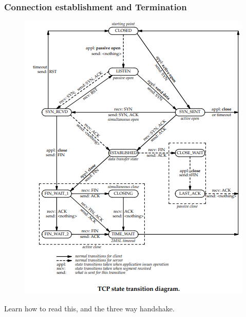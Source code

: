 \documentclass[11pt, a4paper]{article}
\begin{document}
\subsubsection{Connection establishment and Termination}
\begin{figure}[H]
    \centering
    \includegraphics[width = \textwidth]{Pictures/TCP.png}
\end{figure}
Learn how to read this, and the three way handshake.
\end{document}
